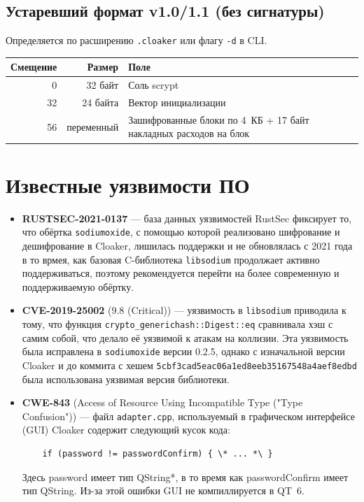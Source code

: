 \documentclass[12pt,a4paper]{article}
\begin{document}
\subsection{Устаревший формат v1.0/1.1 (без сигнатуры)}

Определяется по расширению \texttt{.cloaker} или флагу \texttt{-d} в CLI.

\begin{center}
\begin{tabularx}{\textwidth}{rrX}
    \toprule
    \textbf{Смещение} & \textbf{Размер} & \textbf{Поле} \\
    \midrule
    0   & 32 байт   & Соль scrypt \\
    32  & 24 байта  & Вектор инициализации \\
    56  & переменный & Зашифрованные блоки по 4~КБ + 17 байт накладных расходов на блок \\
    \bottomrule
\end{tabularx}
\end{center}

\section{Известные уязвимости ПО}

\begin{itemize}
    \item \textbf{RUSTSEC-2021-0137} --- база данных уязвимостей RustSec фиксирует то, что обёртка \texttt{sodiumoxide}, с помощью которой реализовано шифрование и дешифрование в Cloaker, лишилась поддержки и не обновлялась с 2021 года в то врмея, как базовая C-библиотека \texttt{libsodium} продолжает активно поддерживаться, поэтому рекомендуется перейти на более современную и поддерживаемую обёртку.
    \item \textbf{CVE-2019-25002} (9.8 (Critical)) --- уязвимость в \texttt{libsodium} приводила к тому, что функция \texttt{crypto\_generichash::Digest::eq} сравнивала хэш с самим собой, что делало её уязвимой к атакам на коллизии. Эта уязвимость была исправлена в \texttt{sodiumoxide} версии 0.2.5, однако с изначальной версии Cloaker и до коммита с хешем \texttt{5cbf3cad5eac06a1ed8eeb35167548a4aef8edbd} была использована уязвимая версия библиотеки.
    \item \textbf{CWE-843} (Access of Resource Using Incompatible Type ("Type Confusion")) --- файл \texttt{adapter.cpp}, используемый в графическом интерфейсе (GUI) Cloaker содержит следующий кусок кода:
    \begin{lstlisting}
    if (password != passwordConfirm) { \* ... *\ }
    \end{lstlisting}
    Здесь password имеет тип QString*, в то время как passwordConfirm имеет тип QString.
    Из-за этой ошибки GUI не компиллируется в QT~6.
\end{itemize}
\end{document}
